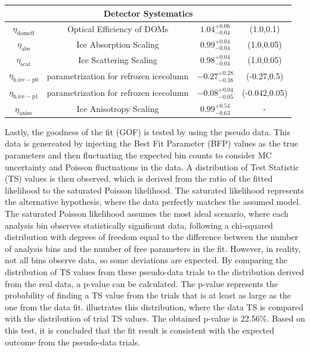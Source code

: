 \begin{table}[h]
{\begin{tabular}{ c c |c|c}
        \multicolumn{4}{c}{\textbf{Detector Systematics}}\\
        \hline
        $\eta_{\mathrm{domeff}}$& Optical Efficiency of DOMs & $1.04_{-0.04}^{+0.06}$ & (1.0,0.1)\\
        \hline
        $\eta_{\mathrm{abs}}$& Ice Absorption Scaling & $0.99_{-0.04}^{+0.04}$ & (1.0,0.05)\\
        \hline
        $\eta_{\mathrm{scat}}$& Ice Scattering Scaling & $0.98_{-0.04}^{+0.04}$ & (1.0,0.05)\\
        \hline
        $\eta_{\mathrm{h.ice-p0}}$& parametrization for refrozen icecolumn & $-0.27_{-0.38}^{+0.28}$ & (-0.27,0.5)\\
        \hline
        $\eta_{\mathrm{h.ice-p1}}$& parametrization for refrozen icecolumn & $-0.08_{-0.05}^{+0.04}$ & (-0.042,0.05)\\
        \hline
        $\eta_{\mathrm{aniso}}$& Ice Anisotropy Scaling & $0.99_{-0.63}^{+0.54}$ & -\\
        \hline
        \hline
    \end{tabular}
    }
\end{table}



Lastly, the goodness of the fit (GOF) is tested by using the pseudo data. This data is genereated by injecting the Best Fit Parameter (BFP) values as the true parameters and then fluctuating the expected bin counts to consider MC uncertainty and Poisson fluctuations in the data. A distribution of Test Statistic (TS) values is then observed, which is derived from the ratio of the fitted likelihood to the saturated Poisson likelihood. The saturated likelihood represents the alternative hypothesis, where the data perfectly matches the assumed model. The saturated Poisson likelihood assumes the most ideal scenario, where each analysis bin observes statistically significant data, following a chi-squared distribution with degrees of freedom equal to the difference between the number of analysis bins and the number of free parameters in the fit. However, in reality, not all bins observe data, so some deviations are expected. By comparing the distribution of TS values from these pseudo-data trials to the distribution derived from the real data, a p-value can be calculated. The p-value represents the probability of finding a TS value from the trials that is at least as large as the one from the data fit.  illustrates this distribution, where the data TS is compared with the distribution of trial TS values. The obtained p-value is 22.56\%. Based on this test, it is concluded that the fit result is consistent with the expected outcome from the pseudo-data trials.


